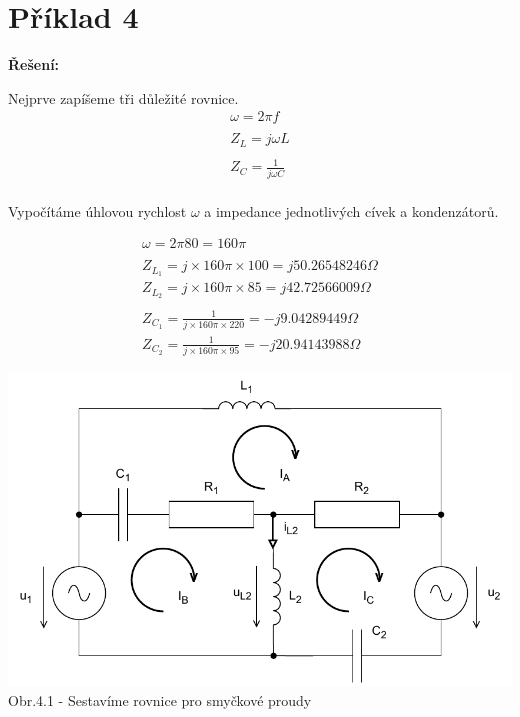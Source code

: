 \section{Příklad 4}

\large{\textbf{Řešení:}}

\begin{center}
    Nejprve zapíšeme tři důležité rovnice.
    \begin{gather*}
    \omega = 2 \pi f\\\\
    Z_L = j \omega L \\\\
    Z_C = \frac{1}{j \omega C} \\
    \end{gather*}
    
    Vypočítáme úhlovou rychlost $\omega$ a impedance jednotlivých cívek a kondenzátorů.
    
    \begin{gather*}
        \omega = 2 \pi 80 = 160 \pi \\\\
        Z_{L_1} = j \times 160 \pi  \times 100 = j50.26548246 \Omega \\
        Z_{L_2} = j \times 160 \pi \times 85 = j42.72566009 \Omega \\\\
        Z_{C_1} = \frac{1}{j \times 160 \pi \times 220} = -j9.04289449 \Omega \\
        Z_{C_2} = \frac{1}{j \times 160 \pi \times 95} = -j20.94143988 \Omega
    \end{gather*}
    
\end{center}

\newpage

\begin{center}
    \includegraphics[scale=0.8,keepaspectratio]{fig/solutions/04-sol/04-step1.pdf} \\
    Obr.4.1 - Sestavíme rovnice pro smyčkové proudy
\end{center}

